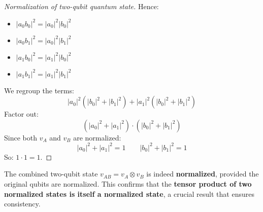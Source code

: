 \begin{proof}[Normalization of two-qubit quantum state]
    \noindent
    Hence:
    \begin{itemize}
        \item $\left|a_{0} b_{0}\right|^{2} = \left|a_{0}\right|^{2} \left|b_{0}\right|^{2}$
        \item $\left|a_{0} b_{1}\right|^{2} = \left|a_{0}\right|^{2} \left|b_{1}\right|^{2}$
        \item $\left|a_{1} b_{0}\right|^{2} = \left|a_{1}\right|^{2} \left|b_{0}\right|^{2}$
        \item $\left|a_{1} b_{1}\right|^{2} = \left|a_{1}\right|^{2} \left|b_{1}\right|^{2}$
    \end{itemize}
    We regroup the terms:
    \begin{equation*}
        \left|a_{0}\right|^{2} \left(\left|b_{0}\right|^{2} + \left|b_{1}\right|^{2}\right) + \left|a_{1}\right|^{2} \left(\left|b_{0}\right|^{2} + \left|b_{1}\right|^{2}\right)
    \end{equation*}
    Factor out:
    \begin{equation*}
        \left(\left|a_{0}\right|^{2} + \left|a_{1}\right|^{2}\right) \cdot \left(\left|b_{0}\right|^{2} + \left|b_{1}\right|^{2}\right)
    \end{equation*}
    Since both $v_{A}$ and $v_{B}$ are normalized:
    \begin{equation*}
        \left|a_{0}\right|^{2} + \left|a_{1}\right|^{2} = 1 \hspace{2em} \left|b_{0}\right|^{2} + \left|b_{1}\right|^{2} = 1
    \end{equation*}
    So: $1 \cdot 1 = 1$.
\end{proof}

The combined two-qubit state $v_{AB} = v_{A} \otimes v_{B}$ is indeed \textbf{normalized}, provided the original qubits are normalized. This confirms that the \textbf{tensor product of two normalized states is itself a normalized state}, a crucial result that ensures consistency.